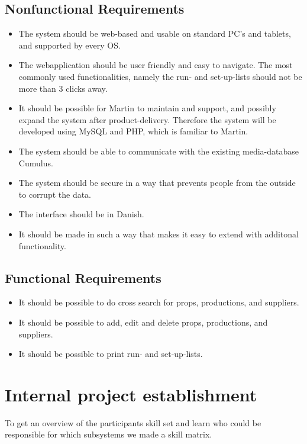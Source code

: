 \documentclass[12pt]{article}
\begin{document}
\subsection{Nonfunctional Requirements}
\begin{itemize}
  \item The system should be web-based and usable on standard PC's and tablets, and supported by every OS.
  \item The webapplication should be user friendly and easy to navigate. The most commonly used functionalities, namely the run- and set-up-lists should not be more than 3 clicks away.
  \item It should be possible for Martin to maintain and support, and possibly expand the system after product-delivery. Therefore the system will be developed using MySQL and PHP, which is familiar to Martin.
  \item The system should be able to communicate with the existing media-database Cumulus.
  \item The system should be secure in a way that prevents people from the outside to corrupt the data.
  \item The interface should be in Danish.
  \item It should be made in such a way that makes it easy to extend with additonal functionality.
\end{itemize}
\subsection{Functional Requirements}
\begin{itemize}
  \item It should be possible to do cross search for props, productions, and suppliers.
  \item It should be possible to add, edit and delete props, productions, and suppliers.
  \item It should be possible to print run- and set-up-lists.
\end{itemize}
\section{Internal project establishment}
To get an overview of the participants skill set and learn who could be responsible for which subsystems we made a skill matrix.\\
\end{document}
